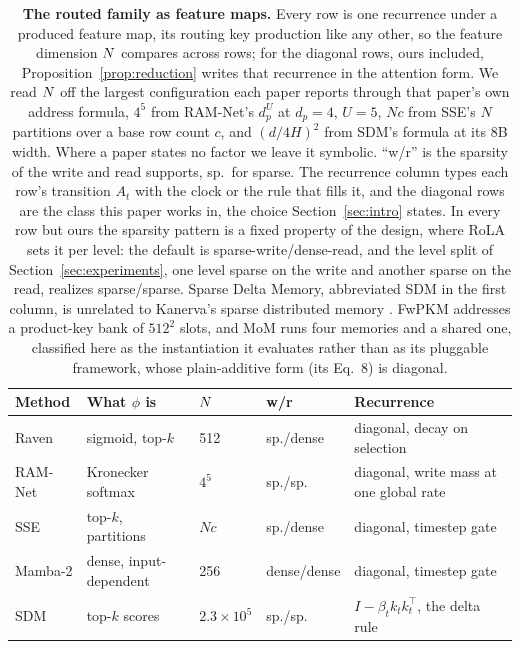 \begin{table}[H]
\centering
\scriptsize
\caption{\textbf{The routed family as feature maps.} Every row is one recurrence under a produced feature map, its routing key production like any other, so the feature dimension $N$ compares across rows; for the diagonal rows, ours included, Proposition~\ref{prop:reduction} writes that recurrence in the attention form. We read $N$ off the largest configuration each paper reports through that paper's own address formula, $4^5$ from RAM-Net's $d_p^U$ at $d_p = 4$, $U = 5$, $Nc$ from SSE's $N$ partitions over a base row count $c$, and $(d/4H)^2$ from SDM's formula at its 8B width. Where a paper states no factor we leave it symbolic. ``w/r'' is the sparsity of the write and read supports, sp.\ for sparse. The recurrence column types each row's transition $A_t$ with the clock or the rule that fills it, and the diagonal rows are the class this paper works in, the choice Section~\ref{sec:intro} states. In every row but ours the sparsity pattern is a fixed property of the design, where RoLA sets it per level: the default is sparse-write/dense-read, and the level split of Section~\ref{sec:experiments}, one level sparse on the write and another sparse on the read, realizes sparse/sparse. Sparse Delta Memory, abbreviated SDM in the first column, is unrelated to Kanerva's sparse distributed memory \citep{kanerva1988sdm}. FwPKM addresses a product-key bank of $512^2$ slots, and MoM runs four memories and a shared one, classified here as the instantiation it evaluates rather than as its pluggable framework, whose plain-additive form (its Eq.~8) is diagonal.}
\label{tab:family}
\setlength{\tabcolsep}{3pt}
\begin{tabular}{@{}lllll@{}}
\toprule
Method & What $\phi$ is & $N$ & w/r & Recurrence \\
\midrule
Raven \citep{afzal2026raven}   & sigmoid, top-$k$       & 512               & sp./dense   & diagonal, decay on selection \\
RAM-Net \citep{xiao2026ramnet} & Kronecker softmax      & $4^5$             & sp./sp.\    & diagonal, write mass at one global rate \\
SSE \citep{sse2025}            & top-$k$, partitions    & $Nc$              & sp./dense   & diagonal, timestep gate \\
Mamba-2 \citep{dao2024mamba2}  & dense, input-dependent & 256               & dense/dense & diagonal, timestep gate \\
SDM \citep{cabannes2026sdm}    & top-$k$ scores         & $2.3{\times}10^5$ & sp./sp.\    & $I - \beta_t k_t k_t^\top$, the delta rule \\

\end{tabular}
\end{table}
